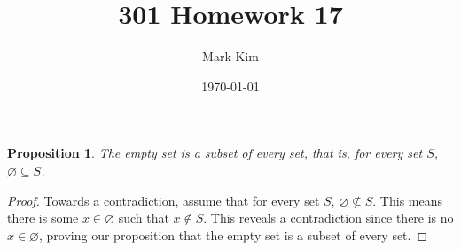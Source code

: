 \documentclass[12pt]{amsart}
\title{301 Homework 17}
\author{Mark Kim}
\date{\today}
\newtheorem*{proposition}{Proposition}
\begin{document}
\maketitle

\begin{proposition}
The empty set is a subset of every set, that is, for every set $S$, $\varnothing \subseteq S$.
\end{proposition}

\begin{proof}
Towards a contradiction, assume that for every set $S$, $\varnothing \nsubseteq S$.  This means there is some $x\in \varnothing$ such that $x \notin S$.  This reveals a contradiction since there is no $x\in \varnothing$, proving our proposition that the empty set is a subset of every set.
\end{proof}
\end{document}
